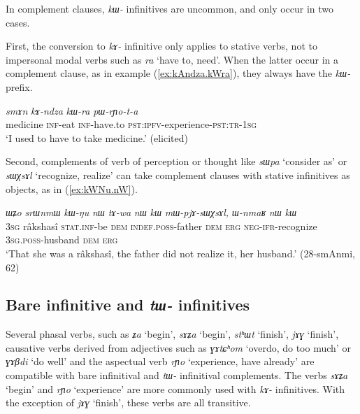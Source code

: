 \documentclass[oneside,a4paper,11pt]{article}
\newcommand{\ipa}[1]{\textit{\phon#1}}
\newcommand{\jpg}[2]{\ipa{#1} `#2'}
\begin{document}
In complement clauses, \ipa{kɯ-} infinitives are uncommon, and only occur in two cases.
 
 First, the conversion to \ipa{kɤ-} infinitive only applies to stative verbs, not to  impersonal modal verbs such as \jpg{ra}{have to, need}. When the latter occur in a complement clause, as in example (\ref{ex:kAndza.kWra}), they always have the \ipa{kɯ-} prefix.

\begin{exe}
\ex \label{ex:kAndza.kWra}
\gll 
\ipa{smɤn} 	\ipa{kɤ-ndza} 	\ipa{kɯ-ra} 	\ipa{pɯ-rɲo-t-a} \\ 
medicine \textsc{inf}-eat \textsc{inf}-have.to  \textsc{pst:ipfv}-experience-\textsc{pst:tr-1sg} \\
\glt `I used to have to take medicine.' (elicited)
\end{exe}
 
 Second, complements of verb of perception or thought like \jpg{sɯpa}{consider as} or \jpg{sɯχsɤl}{recognize, realize} can take complement clauses with stative infinitives as objects, as in (\ref{ex:kWNu.nW}).
\begin{exe}
\ex \label{ex:kWNu.nW}
\gll \ipa{ɯʑo} 	\ipa{srɯnmɯ} 	\ipa{kɯ-ŋu} 	\ipa{nɯ} 	\ipa{tɤ-wa} 	\ipa{nɯ} 	\ipa{kɯ} 	\ipa{mɯ-pjɤ-sɯχsɤl,} 	\ipa{ɯ-nmaʁ} 	\ipa{nɯ} 	\ipa{kɯ} \\
\textsc{3sg} râkshasî \textsc{stat.inf}-be \textsc{dem} \textsc{indef.poss}-father \textsc{dem} \textsc{erg} \textsc{neg-ifr}-recognize \textsc{3sg.poss}-husband \textsc{dem} \textsc{erg} \\
\glt `That she was a râkshasî, the father did not realize it, her husband.' (28-smAnmi, 62)
\end{exe}



 \subsection{Bare infinitive and \ipa{tɯ-} infinitives} \label{sec:bareinf}
Several phasal verbs, such as \jpg{ʑa}{begin}, \jpg{sɤʑa}{begin}, \jpg{stʰɯt}{finish}, \jpg{jɤɣ}{finish}, causative verbs derived from adjectives such as \jpg{ɣɤtɕʰom}{overdo, do too much} or \jpg{ɣɤβdi}{do well} and the aspectual verb \jpg{rɲo}{experience, have already} are compatible with bare infinitival and \ipa{tɯ-} infinitival complements. The verbs \jpg{sɤʑa}{begin} and \jpg{rɲo}{experience} are more commonly used with \ipa{kɤ-} infinitives. With the exception of \jpg{jɤɣ}{finish}, these verbs are all transitive.
\end{document}
